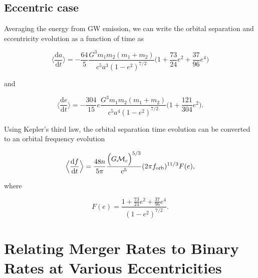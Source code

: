 \documentclass[twocolumn]{aastex631}
\begin{document}
{%


\subsection{Eccentric case}
\label{sec:ecc}
 Averaging the energy from GW emission, we can write the orbital separation and eccentricity evolution as a function of time as

\begin{equation}
    \Big\langle \frac{\mathrm{d}a}{\mathrm{d}t} \Big\rangle = - \frac{64}{5} \frac{G^3 m_1 m_2 (m_1 + m_2)}{c^5 a^3 (1 - e^2)^{7/2}} \Big(1 + \frac{73}{24} e^2 + \frac{37}{96} e^4 \Big)
    \label{eq:dadt}
\end{equation}

\noindent and 

\begin{equation}
    \Big\langle\frac{\mathrm{d}e}{\mathrm{d}t}\Big\rangle = -\frac{304}{15} e \frac{G^3 m_1 m_2 (m_1 + m_2)}{c^5 a^4 (1-e^2)^{7/2}} \Big( 1 + \frac{121}{304} e^{2}\Big).
    \label{eq:dedt}
\end{equation}

Using Kepler's third law, the orbital separation time evolution can be converted to an orbital frequency evolution 

\begin{equation}
    \Big\langle\frac{\mathrm{d}f}{\mathrm{d}t}\Big\rangle = \frac{48 n}{5 \pi} \frac{\Big(G \mathcal{M}_c \Big)^{5/3}}{c^5} (2 \pi f_{\rm orb})^{11/3} F(e), 
    \label{eq:fdot}
\end{equation}

\noindent where 

\begin{equation}
    F(e) = \frac{1 + \frac{73}{24} e^2 + \frac{37}{96} e^4}{(1 - e^2)^{7/2}}.
    \label{eq:eccentricity_enhancement_factor}
\end{equation}


\section{Relating Merger Rates to Binary Rates at Various Eccentricities}

}
\end{document}
